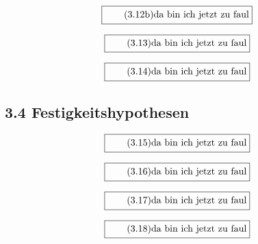 \documentclass[11pt]{article}
\newcommand{\1}{ {\mathds{1}} }
\begin{document}
    \begin{equation}
      \boxed{
        \tag{3.12b}
        \begin{split}
          \text{da bin ich jetzt zu faul}
        \end{split}
      }
    \end{equation}

    \begin{equation}
      \boxed{
        \tag{3.13}
        \begin{split}
          \text{da bin ich jetzt zu faul}
        \end{split}
      }
    \end{equation}

    \begin{equation}
      \boxed{
        \tag{3.14}
        \begin{split}
          \text{da bin ich jetzt zu faul}
        \end{split}
      }
    \end{equation}

    \subsection*{3.4 Festigkeitshypothesen}

    \begin{equation}
      \boxed{
        \tag{3.15}
        \begin{split}
          \text{da bin ich jetzt zu faul}
        \end{split}
      }
    \end{equation}

    \begin{equation}
      \boxed{
        \tag{3.16}
        \begin{split}
          \text{da bin ich jetzt zu faul}
        \end{split}
      }
    \end{equation}

    \begin{equation}
      \boxed{
        \tag{3.17}
        \begin{split}
          \text{da bin ich jetzt zu faul}
        \end{split}
      }
    \end{equation}

    \begin{equation}
      \boxed{
        \tag{3.18}
        \begin{split}
          \text{da bin ich jetzt zu faul}
        \end{split}
      }
    \end{equation}
\end{document}
